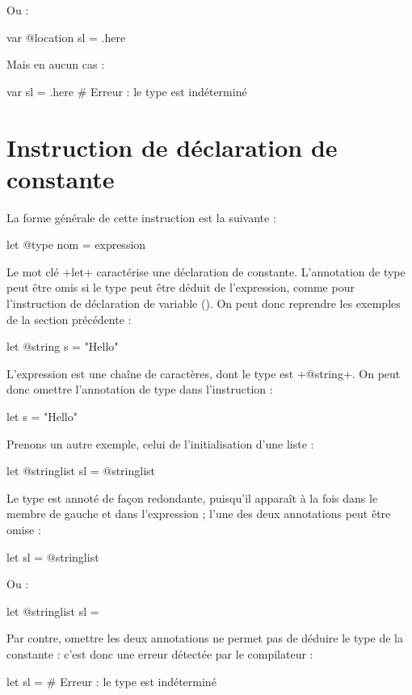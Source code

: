 Ou :
\begin{galgas}
var @location sl = .here
\end{galgas}

Mais en aucun cas :
\begin{galgas}
var sl = .here # Erreur : le type est indéterminé
\end{galgas}





\section{Instruction de déclaration de constante}

La forme générale de cette instruction est la suivante :

\begin{galgasbox}
let @type nom = expression
\end{galgasbox}

Le mot clé \ggs+let+ caractérise une déclaration de constante. L'annotation de type peut être omis si le type peut être déduit de l'expression, comme pour l'instruction de déclaration de variable (). On peut donc reprendre les exemples de la section précédente :
\begin{galgas}
let @string s = "Hello"
\end{galgas}

L'expression est une chaîne de caractères, dont le type est \ggs+@string+. On peut donc omettre l'annotation de type dans l'instruction :
\begin{galgas}
let s = "Hello"
\end{galgas}


Prenons un autre exemple, celui de l'initialisation d'une liste :
\begin{galgas}
let @stringlist sl = @stringlist {}
\end{galgas}

Le type est annoté de façon redondante, puisqu'il apparaît à la fois dans le membre de gauche et dans l'expression ; l'une des deux annotations peut être omise :
\begin{galgas}
let sl = @stringlist {}
\end{galgas}

Ou :
\begin{galgas}
let @stringlist sl = {}
\end{galgas}

Par contre, omettre les deux annotations ne permet pas de déduire le type de la constante : c'est donc une erreur détectée par le compilateur :
\begin{galgas}
let sl = {} # Erreur : le type est indéterminé
\end{galgas}


